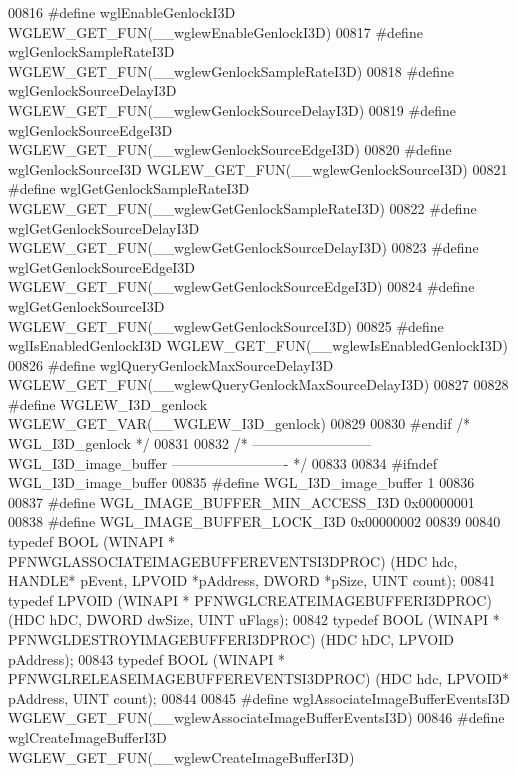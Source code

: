 \begin{DoxyCode}
00816 \textcolor{preprocessor}{#define wglEnableGenlockI3D WGLEW\_GET\_FUN(\_\_wglewEnableGenlockI3D)}
00817 \textcolor{preprocessor}{#define wglGenlockSampleRateI3D WGLEW\_GET\_FUN(\_\_wglewGenlockSampleRateI3D)}
00818 \textcolor{preprocessor}{#define wglGenlockSourceDelayI3D WGLEW\_GET\_FUN(\_\_wglewGenlockSourceDelayI3D)}
00819 \textcolor{preprocessor}{#define wglGenlockSourceEdgeI3D WGLEW\_GET\_FUN(\_\_wglewGenlockSourceEdgeI3D)}
00820 \textcolor{preprocessor}{#define wglGenlockSourceI3D WGLEW\_GET\_FUN(\_\_wglewGenlockSourceI3D)}
00821 \textcolor{preprocessor}{#define wglGetGenlockSampleRateI3D WGLEW\_GET\_FUN(\_\_wglewGetGenlockSampleRateI3D)}
00822 \textcolor{preprocessor}{#define wglGetGenlockSourceDelayI3D WGLEW\_GET\_FUN(\_\_wglewGetGenlockSourceDelayI3D)}
00823 \textcolor{preprocessor}{#define wglGetGenlockSourceEdgeI3D WGLEW\_GET\_FUN(\_\_wglewGetGenlockSourceEdgeI3D)}
00824 \textcolor{preprocessor}{#define wglGetGenlockSourceI3D WGLEW\_GET\_FUN(\_\_wglewGetGenlockSourceI3D)}
00825 \textcolor{preprocessor}{#define wglIsEnabledGenlockI3D WGLEW\_GET\_FUN(\_\_wglewIsEnabledGenlockI3D)}
00826 \textcolor{preprocessor}{#define wglQueryGenlockMaxSourceDelayI3D WGLEW\_GET\_FUN(\_\_wglewQueryGenlockMaxSourceDelayI3D)}
00827 
00828 \textcolor{preprocessor}{#define WGLEW\_I3D\_genlock WGLEW\_GET\_VAR(\_\_WGLEW\_I3D\_genlock)}
00829 
00830 \textcolor{preprocessor}{#endif }\textcolor{comment}{/* WGL\_I3D\_genlock */}\textcolor{preprocessor}{}
00831 
00832 \textcolor{comment}{/* -------------------------- WGL\_I3D\_image\_buffer ------------------------- */}
00833 
00834 \textcolor{preprocessor}{#ifndef WGL\_I3D\_image\_buffer}
00835 \textcolor{preprocessor}{#define WGL\_I3D\_image\_buffer 1}
00836 
00837 \textcolor{preprocessor}{#define WGL\_IMAGE\_BUFFER\_MIN\_ACCESS\_I3D 0x00000001}
00838 \textcolor{preprocessor}{#define WGL\_IMAGE\_BUFFER\_LOCK\_I3D 0x00000002}
00839 
00840 \textcolor{keyword}{typedef} BOOL (WINAPI * PFNWGLASSOCIATEIMAGEBUFFEREVENTSI3DPROC) (HDC hdc, HANDLE* 
      pEvent, LPVOID *pAddress, DWORD *pSize, UINT count);
00841 \textcolor{keyword}{typedef} LPVOID (WINAPI * PFNWGLCREATEIMAGEBUFFERI3DPROC) (HDC hDC, DWORD dwSize, 
      UINT uFlags);
00842 \textcolor{keyword}{typedef} BOOL (WINAPI * PFNWGLDESTROYIMAGEBUFFERI3DPROC) (HDC hDC, LPVOID 
      pAddress);
00843 \textcolor{keyword}{typedef} BOOL (WINAPI * PFNWGLRELEASEIMAGEBUFFEREVENTSI3DPROC) (HDC hdc, LPVOID* 
      pAddress, UINT count);
00844 
00845 \textcolor{preprocessor}{#define wglAssociateImageBufferEventsI3D WGLEW\_GET\_FUN(\_\_wglewAssociateImageBufferEventsI3D)}
00846 \textcolor{preprocessor}{#define wglCreateImageBufferI3D WGLEW\_GET\_FUN(\_\_wglewCreateImageBufferI3D)}

\end{DoxyCode}
